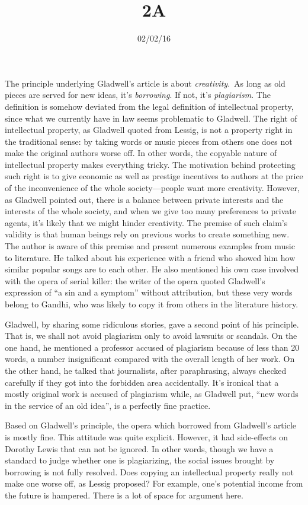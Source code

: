 \documentclass{writing}
\title{2A}
\date{02/02/16}
\begin{document}
\maketitle

The principle underlying Gladwell's article is about
\emph{creativity}.~As long as old pieces are served for new ideas, it's
\emph{borrowing}. If not, it's \emph{plagiarism}. The definition is
somehow deviated from the legal definition of intellectual property,
since what we currently have in law seems problematic to Gladwell. The
right of intellectual property, as Gladwell quoted from Lessig, is not a
property right in the traditional sense: by taking words or music pieces
from others one does not make the original authors worse off. In other
words, the copyable nature of intellectual property makes everything
tricky. The motivation behind protecting such right is to give economic
as well as prestige incentives to authors at the price of the
inconvenience of the whole society---people want more creativity.
However, as Gladwell pointed out, there is a balance between private
interests and the interests of the whole society, and when we give too
many preferences to private agents, it's likely that we might hinder
creativity. The premise of such claim's validity is that human beings
rely on previous works to create something new. The author is aware of
this premise and present numerous examples from music to literature. He
talked about his experience with a friend who showed him how similar
popular songs are to each other. He also mentioned his own case involved
with the opera of serial killer: the writer of the opera quoted
Gladwell's expression of ``a sin and a symptom'' without attribution,
but these very words belong to Gandhi, who was likely to copy it from
others in the literature history.

Gladwell, by sharing some ridiculous stories, gave a second point of his
principle. That is, we shall not avoid plagiarism only to avoid lawsuits
or scandals. On the one hand, he mentioned a professor accused of
plagiarism because of less than 20 words, a number insignificant
compared with the overall length of her work. On the other hand, he
talked that journalists, after paraphrasing, always checked carefully if
they got into the forbidden area accidentally. It's ironical that a
mostly original work is accused of plagiarism while, as Gladwell put,
``new words in the service of an old idea'', is a perfectly fine
practice.

Based on Gladwell's principle, the opera which borrowed from Gladwell's
article is mostly fine. This attitude was quite explicit. However, it
had side-effects on Dorothy Lewis that can not be ignored. In other
words, though we have a standard to judge whether one is plagiarizing,
the social issues brought by borrowing is not fully resolved. Does
copying an intellectual property really not make one worse off, as
Lessig proposed? For example, one's potential income from the future is
hampered. There is a lot of space for argument here.
\end{document}

